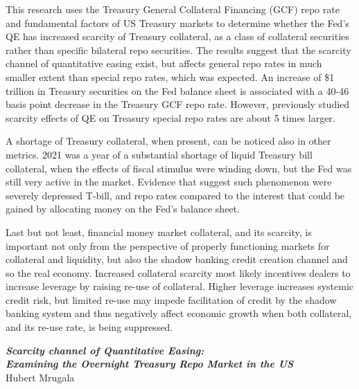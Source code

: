 \documentclass[11pt,a4paper,english,oneside]{article}
\begin{document}
This research uses the Treasury General Collateral Financing (GCF) repo rate and fundamental factors of US Treasury markets to determine whether the Fed's QE has increased scarcity of Treasury collateral, as a class of collateral securities rather than specific bilateral repo securities. The results suggest that the scarcity channel of quantitative easing exist, but affects general repo rates in much smaller extent than special repo rates, which was expected. An increase of \$1 trillion in Treasury securities on the Fed balance sheet is associated with a 40-46 basis point decrease in the Treasury GCF repo rate. However, previously studied scarcity effects of QE on Treasury special repo rates are about 5 times larger.

A shortage of Treasury collateral, when present, can be noticed also in other metrics. 2021 was a year of a substantial shortage of liquid Treasury bill collateral, when the effects of fiscal stimulus were winding down, but the Fed was still very active in the market. Evidence that suggest such phenomenon were severely depressed T-bill, and repo rates compared to the interest that could be gained by allocating money on the Fed's balance sheet.

Last but not least, financial money market collateral, and its scarcity, is important not only from the perspective of properly functioning markets for collateral and liquidity, but also the shadow banking credit creation channel and so the real economy. Increased collateral scarcity most likely incentives dealers to increase leverage by raising re-use of collateral. Higher leverage increases systemic credit risk, but limited re-use may impede facilitation of credit by the shadow banking system and thus negatively affect economic growth when both collateral, and its re-use rate, is being suppressed.
\newpage
\tableofcontents
\newpage
\listoffigures
\listoftables
\newpage
{}

\begin{center}
  {\Large \emph{\textbf{Scarcity channel of Quantitative Easing:\\
  Examining the Overnight Treasury Repo Market in the US}}}\\[4pt]
  Hubert Mrugala
\end{center}

\end{document}
